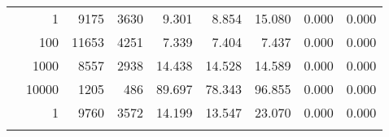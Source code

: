 \begin{table}
\begin{tabular}{rrrrrrrrr}
	            
	        
				\noalign{\smallskip}\hline
				\multirow{ 4 }{*}{ 80000 } &
				
					
					 
					\multirow{ 1 }{*}{ 1 } &
					
						
							    
							     9175  & 3630  
	                           & 9.301 & 8.854 & 15.080
	                           & 0.000 & 0.000  \\
	                
	            
					 &  
					 
					\multirow{ 1 }{*}{ 100 } &
					
						
							    
							     11653  & 4251  
	                           & 7.339 & 7.404 & 7.437
	                           & 0.000 & 0.000  \\
	                
	            
					 &  
					 
					\multirow{ 1 }{*}{ 1000 } &
					
						
							    
							     8557  & 2938  
	                           & 14.438 & 14.528 & 14.589
	                           & 0.000 & 0.000  \\
	                
	            
					 &  
					 
					\multirow{ 1 }{*}{ 10000 } &
					
						
							    
							     1205  & 486  
	                           & 89.697 & 78.343 & 96.855
	                           & 0.000 & 0.000  \\
	                
	            
	        
				\noalign{\smallskip}\hline
				\multirow{ 4 }{*}{ 160000 } &
				
					
					 
					\multirow{ 1 }{*}{ 1 } &
					
						
							    
							     9760  & 3572  
	                           & 14.199 & 13.547 & 23.070
	                           & 0.000 & 0.000  \\
	                
	            
					 &  
					 

\end{tabular}
\end{table}
